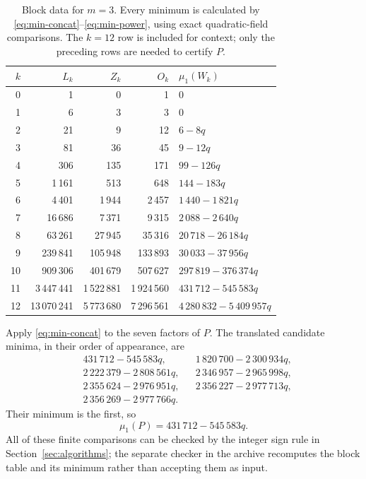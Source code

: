 \documentclass[11pt]{article}
\numberwithin{equation}{section}
\theoremstyle{definition}
\theoremstyle{remark}
\begin{document}
\begin{table}[htbp]
\centering\small
\begin{tabular}{rrrrl}
\toprule
$k$ & $L_k$ & $Z_k$ & $O_k$ & $\mu_1(W_k)$\\
\midrule
0&1&0&1&$0$\\
1&6&3&3&$0$\\
2&21&9&12&$6-8q$\\
3&81&36&45&$9-12q$\\
4&306&135&171&$99-126q$\\
5&1\,161&513&648&$144-183q$\\
6&4\,401&1\,944&2\,457&$1\,440-1\,821q$\\
7&16\,686&7\,371&9\,315&$2\,088-2\,640q$\\
8&63\,261&27\,945&35\,316&$20\,718-26\,184q$\\
9&239\,841&105\,948&133\,893&$30\,033-37\,956q$\\
10&909\,306&401\,679&507\,627&$297\,819-376\,374q$\\
11&3\,447\,441&1\,522\,881&1\,924\,560&$431\,712-545\,583q$\\
12&13\,070\,241&5\,773\,680&7\,296\,561&$4\,280\,832-5\,409\,957q$\\
\bottomrule
\end{tabular}
\caption{Block data for $m=3$. Every minimum is calculated by
\eqref{eq:min-concat}--\eqref{eq:min-power}, using exact quadratic-field
comparisons. The $k=12$ row is included for context; only the preceding
rows are needed to certify $P$.}\label{tab:blocks}
\end{table}

Apply \eqref{eq:min-concat} to the seven factors of $P$. The translated
candidate minima, in their order of appearance, are
\begin{equation}\label{eq:seven-minima}
\begin{aligned}
&431\,712-545\,583q,&&1\,820\,700-2\,300\,934q,\\
&2\,222\,379-2\,808\,561q,&&2\,346\,957-2\,965\,998q,\\
&2\,355\,624-2\,976\,951q,&&2\,356\,227-2\,977\,713q,\\
&2\,356\,269-2\,977\,766q.&&
\end{aligned}
\end{equation}
Their minimum is the first, so
\begin{equation}\label{eq:muP}
\mu_1(P)=431\,712-545\,583q.
\end{equation}
All of these finite comparisons can be checked by the integer sign rule
in Section~\ref{sec:algorithms}; the separate checker in the archive
recomputes the block table and its minimum rather than accepting them as
input.
\end{document}

